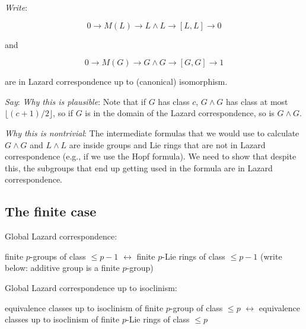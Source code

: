 \documentclass[10pt]{amsart}
\begin{document}
{\em Write}:

$$0 \to M(L) \to L \wedge L \to [L,L] \to 0$$

and

$$0 \to M(G) \to G \wedge G \to [G,G] \to 1$$

are in Lazard correspondence up to (canonical) isomorphism.

{\em Say}: {\em Why this is plausible}: Note that if $G$ has class
$c$, $G \wedge G$ has class at most $\lfloor (c + 1)/2 \rfloor$, so if
$G$ is in the domain of the Lazard correspondence, so is $G \wedge G$.

{\em Why this is nontrivial}: The intermediate formulas that we would
use to calculate $G \wedge G$ and $L \wedge L$ are inside groups and
Lie rings that are not in Lazard correspondence (e.g., if we use the
Hopf formula). We need to show that despite this, the subgroups that
end up getting used in the formula are in Lazard correspondence.

\subsection{The finite case}

Global Lazard correspondence:

finite $p$-groups of class $\le p - 1$ $\leftrightarrow$ finite
$p$-Lie rings of class $\le p - 1$ (write below: additive group is a
finite $p$-group)

Global Lazard correspondence up to isoclinism:

equivalence classes up to isoclinism of finite $p$-group of class $\le
p$ $\leftrightarrow$ equivalence classes up to isoclinism of finite
$p$-Lie rings of class $\le p$
\end{document}
